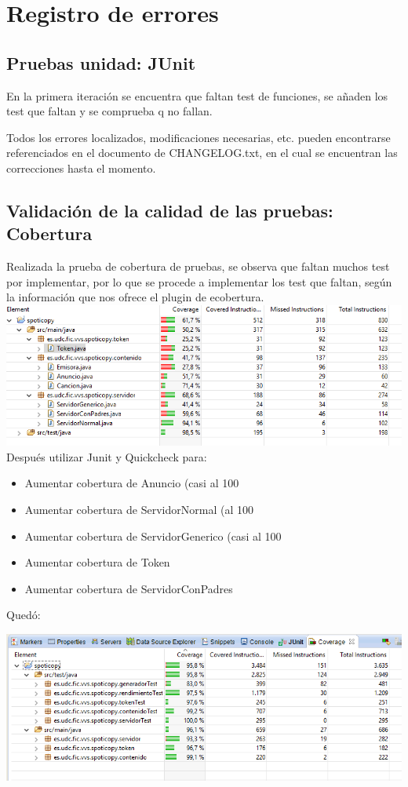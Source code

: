 \documentclass[12pt, a4paper, titlepage]{article}
\begin{document}
		
	\section{Registro de errores}
	\subsection{Pruebas unidad: JUnit}
	En la primera iteración se encuentra que faltan test de funciones, se añaden los test que faltan y se comprueba q no fallan.
	
	Todos los errores localizados, modificaciones necesarias, etc. pueden encontrarse referenciados en el documento de CHANGELOG.txt, en el cual se encuentran las correcciones hasta el momento.
	
	\subsection{Validación de la calidad de las pruebas: Cobertura}
	Realizada la prueba de cobertura de pruebas, se observa que faltan muchos test por implementar, por lo que se procede a implementar los test que faltan, según la información que nos ofrece el plugin de ecobertura.\\
	\includegraphics[width=15cm]{Imagenes/CoberturaSemana1.png} \\
	Después utilizar Junit y Quickcheck para:
	\begin{itemize}
		\item Aumentar cobertura de Anuncio (casi al 100%
		\item Aumentar cobertura de ServidorNormal (al 100%
		\item Aumentar cobertura de ServidorGenerico (casi al 100%
		\item Aumentar cobertura de Token 
		\item Aumentar cobertura de ServidorConPadres
	\end{itemize}
	Quedó:
	
	\includegraphics[width=15cm]{Imagenes/Covertura3.png}
	
\end{document}
